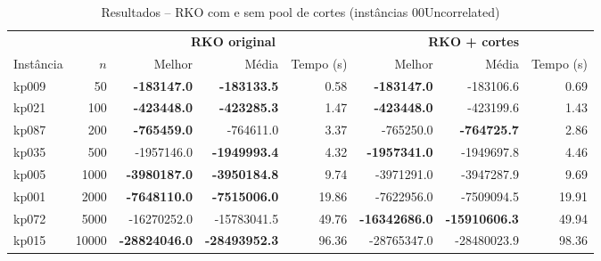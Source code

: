 \begin{table}[htbp]
\centering
\caption{Resultados -- RKO com e sem pool de cortes (instâncias 00Uncorrelated)}
\label{tab:cuts}
\begin{tabular}{lrrrrrrr}
\toprule
 & & \multicolumn{3}{c}{\textbf{RKO original}} & \multicolumn{3}{c}{\textbf{RKO + cortes}} \\
\cmidrule(lr){3-5} \cmidrule(lr){6-8}
Instância & $n$ & Melhor & Média & Tempo (s) & Melhor & Média & Tempo (s) \\
\midrule
kp009 & 50 & \textbf{-183147.0} & \textbf{-183133.5} & 0.58 & \textbf{-183147.0} & -183106.6 & 0.69 \\
kp021 & 100 & \textbf{-423448.0} & \textbf{-423285.3} & 1.47 & \textbf{-423448.0} & -423199.6 & 1.43 \\
kp087 & 200 & \textbf{-765459.0} & -764611.0 & 3.37 & -765250.0 & \textbf{-764725.7} & 2.86 \\
kp035 & 500 & -1957146.0 & \textbf{-1949993.4} & 4.32 & \textbf{-1957341.0} & -1949697.8 & 4.46 \\
kp005 & 1000 & \textbf{-3980187.0} & \textbf{-3950184.8} & 9.74 & -3971291.0 & -3947287.9 & 9.69 \\
kp001 & 2000 & \textbf{-7648110.0} & \textbf{-7515006.0} & 19.86 & -7622956.0 & -7509094.5 & 19.91 \\
kp072 & 5000 & -16270252.0 & -15783041.5 & 49.76 & \textbf{-16342686.0} & \textbf{-15910606.3} & 49.94 \\
kp015 & 10000 & \textbf{-28824046.0} & \textbf{-28493952.3} & 96.36 & -28765347.0 & -28480023.9 & 98.36 \\
\bottomrule
\end{tabular}
\end{table}
